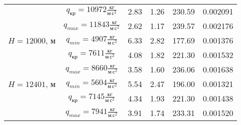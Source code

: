 \begin{tabular}{|c|c|c|c|c|c|}
             & $q_{кр}= 10972 \frac{кг}{м \,с^2}$ &            2.83 &           1.26 &  230.59 &  0.002091 \\
             & $q_{max}= 11843 \frac{кг}{м \,с^2}$ &            2.62 &           1.17 &  239.57 &  0.002176 \\\hline
$H=12000$, м & $q_{min}= 4907 \frac{кг}{м \,с^2}$ &            6.33 &           2.82 &  177.69 &  0.001376 \\
             & $q_{кр}= 7611 \frac{кг}{м \,с^2}$ &            4.08 &           1.82 &  221.30 &  0.001532 \\
             & $q_{max}= 8660 \frac{кг}{м \,с^2}$ &            3.58 &           1.60 &  236.06 &  0.001638 \\\hline
$H=12401$, м & $q_{min}= 5604 \frac{кг}{м \,с^2}$ &            5.54 &           2.47 &  196.00 &  0.001321 \\
             & $q_{кр}= 7145 \frac{кг}{м \,с^2}$ &            4.34 &           1.93 &  221.30 &  0.001438 \\
             & $q_{max}= 7941 \frac{кг}{м \,с^2}$ &            3.91 &           1.74 &  233.31 &  0.001520 \\
\hline
\end{tabular}